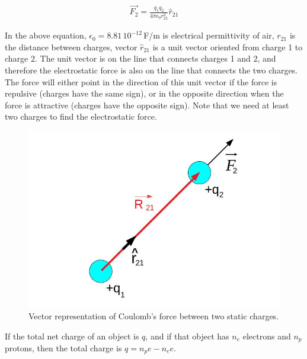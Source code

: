 \documentclass{ximera}
\begin{document}
\begin{eqnarray}
\vec{F_2}=\frac{q_1 q_2}{4 \pi \epsilon_0 r_{21}^2} \hat{r}_{21} \label{EqCoulombslaw}
\end{eqnarray}

In the above equation, $\epsilon_0=8.81\, 10^{-12}$\,F/m is electrical permittivity of air, $r_{21}$ is the distance between charges, vector $\hat{r}_{21}$ is a unit vector oriented from charge 1 to charge 2. The unit vector is on the line that connects charges 1 and 2, and therefore the electrostatic force is also on the line that connects the two charges. The force will either point in the direction of this unit vector if the force is repulsive (charges have the same sign), or in the opposite direction when the force is attractive (charges have the opposite sign). Note that we need at least two charges to find the electrostatic force.


\begin{figure}[htbp]
\begin{center}
\includegraphics[scale=0.5]{../jpg/Two_Static_ChargesV1.jpg}
\end{center}
\caption{Vector representation of Coulomb's force between two static charges.}
\label{twostaticch}
\end{figure}




If the total net charge of an object is $q$, and if that object has $n_e$ electrons and $n_p$ protons, then the total charge is $q=n_p e-n_e e$. 
\end{document}
